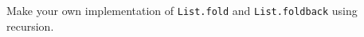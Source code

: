 \label{fold}Make your own implementation of \lstinline{List.fold} and \lstinline{List.foldback} using recursion.

